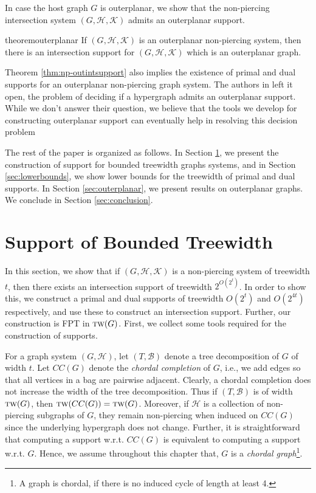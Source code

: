 \documentclass[12pt]{article}
\newcommand{\BB}{\mathcal{B}}
\newcommand{\HH}{\mathcal{H}}
\newcommand{\KK}{\mathcal{K}}
\newcommand{\tw}{\textsc{tw}}
\theoremstyle{case}
\begin{document}
In case the host graph $G$ is outerplanar, we show that the non-piercing intersection system $(G,\HH,\KK)$ admits an outerplanar support.

\begin{restatable}{theorem}{outerplanar}
\label{thm:np-outintsupport}
If $(G,\mathcal{H,K})$ is an outerplanar non-piercing system, then there is an intersection support for $(G,\mathcal{H,K})$ which is an outerplanar graph.
\end{restatable}

Theorem \ref{thm:np-outintsupport} also implies the existence of primal and dual supports for an outerplanar
non-piercing graph system.
The authors in \cite{buchin2011planar} left it open, the problem of deciding if a hypergraph admits an outerplanar support.
While we don't answer their question, we believe that the tools we develop for constructing outerplanar support can eventually help in resolving this decision problem

The rest of the paper is organized as follows. In Section \ref{sec:treewidth}, we present the construction of support for bounded treewidth graphs systems, and in Section \ref{sec:lowerbounds}, we show lower bounds for the treewidth of primal and dual supports.
In Section \ref{sec:outerplanar},
we present results on outerplanar graphs.
We conclude in Section \ref{sec:conclusion}.

\section{Support of Bounded Treewidth}
\label{sec:treewidth}
In this section, we show that if $(G,\mathcal{H,K})$ is a non-piercing system of treewidth $t$, then there exists an intersection support
of treewidth $2^{O(2^{t})}$. In order to show this, we 
construct a primal and dual supports of treewidth $O(2^{t})$ and $O(2^{4t})$ respectively, 
and use these to construct an intersection support.
Further, our construction is FPT in $\tw(G)$.
First, we collect some tools required for the construction of supports.

For a graph system $(G,\mathcal{H})$, let $(T,\mathcal{B})$ 
denote a tree decomposition of $G$ of width $t$. Let $CC(G)$ denote the
\emph{chordal completion} of $G$, i.e., we add edges so that
all vertices in a bag are pairwise adjacent. 
Clearly, a chordal completion does not increase the width of the tree decomposition.
Thus if $(T,\BB)$ is of width $\tw(G)$, then $\tw(CC(G))=\tw(G)$.
Moreover, if $\HH$ is a collection of non-piercing subgraphs of $G$, they remain non-piercing when induced on $CC(G)$ since the underlying hypergraph does not change.
Further, it is straightforward that computing a support w.r.t. $CC(G)$ is equivalent
to computing a support w.r.t. $G$.
Hence, we assume 
throughout this chapter that, $G$ is a \emph{chordal graph}\footnote{A graph is chordal, if there is no induced cycle of length at least 4.}.
\end{document}
